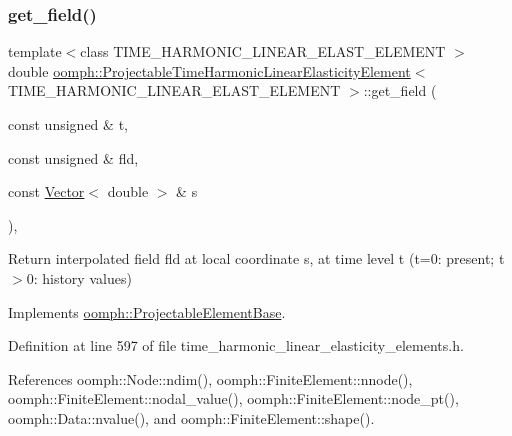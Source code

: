 \subsubsection{\texorpdfstring{get\+\_\+field()}{get\_field()}}
{\footnotesize\ttfamily template$<$class T\+I\+M\+E\+\_\+\+H\+A\+R\+M\+O\+N\+I\+C\+\_\+\+L\+I\+N\+E\+A\+R\+\_\+\+E\+L\+A\+S\+T\+\_\+\+E\+L\+E\+M\+E\+NT $>$ \\
double \hyperlink{classoomph_1_1ProjectableTimeHarmonicLinearElasticityElement}{oomph\+::\+Projectable\+Time\+Harmonic\+Linear\+Elasticity\+Element}$<$ T\+I\+M\+E\+\_\+\+H\+A\+R\+M\+O\+N\+I\+C\+\_\+\+L\+I\+N\+E\+A\+R\+\_\+\+E\+L\+A\+S\+T\+\_\+\+E\+L\+E\+M\+E\+NT $>$\+::get\+\_\+field (\begin{DoxyParamCaption}\item[{const unsigned \&}]{t,  }\item[{const unsigned \&}]{fld,  }\item[{const \hyperlink{classoomph_1_1Vector}{Vector}$<$ double $>$ \&}]{s }\end{DoxyParamCaption})\hspace{0.3cm}{\ttfamily [inline]}, {\ttfamily [virtual]}}



Return interpolated field fld at local coordinate s, at time level t (t=0\+: present; t$>$0\+: history values) 



Implements \hyperlink{classoomph_1_1ProjectableElementBase_ae4da5b565b6d333be2f5920f7be763cd}{oomph\+::\+Projectable\+Element\+Base}.



Definition at line 597 of file time\+\_\+harmonic\+\_\+linear\+\_\+elasticity\+\_\+elements.\+h.



References oomph\+::\+Node\+::ndim(), oomph\+::\+Finite\+Element\+::nnode(), oomph\+::\+Finite\+Element\+::nodal\+\_\+value(), oomph\+::\+Finite\+Element\+::node\+\_\+pt(), oomph\+::\+Data\+::nvalue(), and oomph\+::\+Finite\+Element\+::shape().

\mbox{\label{classoomph_1_1ProjectableTimeHarmonicLinearElasticityElement_af5b374081d576de7e29fe579ea06fd7d}} 
